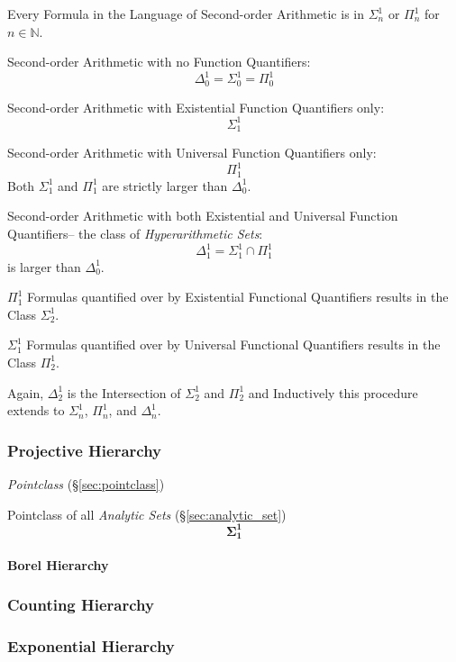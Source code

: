 Every Formula in the Language of Second-order Arithmetic is in
$\Sigma^1_n$ or $\Pi^1_n$ for $n \in \mathbb{N}$.

Second-order Arithmetic with no Function Quantifiers:
\[
  \Delta^1_0 = \Sigma^1_0 = \Pi^1_0
\]

Second-order Arithmetic with Existential Function Quantifiers only:
\[
  \Sigma^1_1
\]

Second-order Arithmetic with Universal Function Quantifiers only:
\[
  \Pi^1_1
\]
Both $\Sigma^1_1$ and $\Pi^1_1$ are strictly larger than $\Delta^1_0$.

Second-order Arithmetic with both Existential and Universal Function
Quantifiers-- the class of \emph{Hyperarithmetic Sets}:
\[
  \Delta^1_1 = \Sigma^1_1 \cap \Pi^1_1
\]
is larger than $\Delta^1_0$.

$\Pi^1_1$ Formulas quantified over by Existential Functional
Quantifiers results in the Class $\Sigma^1_2$.

$\Sigma^1_1$ Formulas quantified over by Universal Functional
Quantifiers results in the Class $\Pi^1_2$.

Again, $\Delta^1_2$ is the Intersection of $\Sigma^1_2$ and $\Pi^1_2$
and Inductively this procedure extends to $\Sigma^1_n$, $\Pi^1_n$, and
$\Delta^1_n$.



\subsubsection{Projective Hierarchy}\label{sec:projective_hierarchy}

\emph{Pointclass} (\S\ref{sec:pointclass})

Pointclass of all \emph{Analytic Sets} (\S\ref{sec:analytic_set})
\[
  \mathbf{\Sigma^1_1}
\]

\paragraph{Borel Hierarchy}\hfill



\subsubsection{Counting Hierarchy}

\subsubsection{Exponential Hierarchy}

